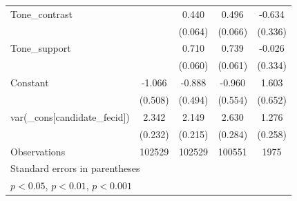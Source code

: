 \begin{tabular}{l*{4}{c}}
Tone\_contrast            &                     &       0.440\sym{***}&       0.496\sym{***}&      -0.634         \\
                    &                     &     (0.064)         &     (0.066)         &     (0.336)         \\
Tone\_support             &                     &       0.710\sym{***}&       0.739\sym{***}&      -0.026         \\
                    &                     &     (0.060)         &     (0.061)         &     (0.334)         \\
Constant            &      -1.066\sym{*}  &      -0.888         &      -0.960         &       1.603\sym{*}  \\
                    &     (0.508)         &     (0.494)         &     (0.554)         &     (0.652)         \\
\midrule
var(\_cons[candidate\_fecid])&       2.342\sym{***}&       2.149\sym{***}&       2.630\sym{***}&       1.276\sym{***}\\
                    &     (0.232)         &     (0.215)         &     (0.284)         &     (0.258)         \\
\midrule
Observations        &      102529         &      102529         &      100551         &        1975         \\
\bottomrule
\multicolumn{5}{l}{\footnotesize Standard errors in parentheses}\\
\multicolumn{5}{l}{\footnotesize \sym{*} \(p<0.05\), \sym{**} \(p<0.01\), \sym{***} \(p<0.001\)}\\
\end{tabular}
